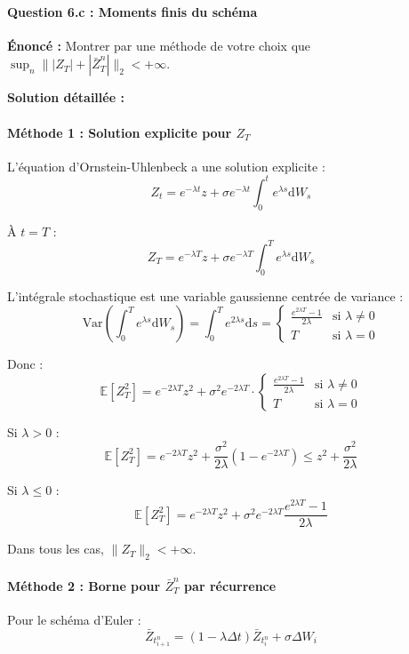 \documentclass[12pt,a4paper]{article}
\theoremstyle{definition}
\theoremstyle{remark}
\newcommand{\E}{\mathbb{E}}
\newcommand{\Var}{\text{Var}}
\newcommand{\dd}{\mathrm{d}}
\begin{document}
\paragraph{Question 6.c : Moments finis du schéma}

\textbf{Énoncé :} Montrer par une méthode de votre choix que $\sup_n \||Z_T| + |\bar{Z}_T^n|\|_2 < +\infty$.

\textbf{Solution détaillée :}

\paragraph{Méthode 1 : Solution explicite pour $Z_T$}

L'équation d'Ornstein-Uhlenbeck a une solution explicite :
\[
Z_t = e^{-\lambda t}z + \sigma e^{-\lambda t}\int_0^t e^{\lambda s}\dd W_s
\]

À $t = T$ :
\[
Z_T = e^{-\lambda T}z + \sigma e^{-\lambda T}\int_0^T e^{\lambda s}\dd W_s
\]

L'intégrale stochastique est une variable gaussienne centrée de variance :
\[
\Var\left(\int_0^T e^{\lambda s}\dd W_s\right) = \int_0^T e^{2\lambda s}\dd s = \begin{cases}
\frac{e^{2\lambda T} - 1}{2\lambda} & \text{si } \lambda \neq 0 \\
T & \text{si } \lambda = 0
\end{cases}
\]

Donc :
\[
\E[Z_T^2] = e^{-2\lambda T}z^2 + \sigma^2 e^{-2\lambda T} \cdot \begin{cases}
\frac{e^{2\lambda T} - 1}{2\lambda} & \text{si } \lambda \neq 0 \\
T & \text{si } \lambda = 0
\end{cases}
\]

Si $\lambda > 0$ :
\[
\E[Z_T^2] = e^{-2\lambda T}z^2 + \frac{\sigma^2}{2\lambda}(1 - e^{-2\lambda T}) \leq z^2 + \frac{\sigma^2}{2\lambda}
\]

Si $\lambda \leq 0$ :
\[
\E[Z_T^2] = e^{-2\lambda T}z^2 + \sigma^2 e^{-2\lambda T} \frac{e^{2\lambda T} - 1}{2\lambda}
\]

Dans tous les cas, $\|Z_T\|_2 < +\infty$.

\paragraph{Méthode 2 : Borne pour $\bar{Z}_T^n$ par récurrence}

Pour le schéma d'Euler :
\[
\bar{Z}_{t_{i+1}^n} = (1 - \lambda \Delta t)\bar{Z}_{t_i^n} + \sigma \Delta W_i
\]
\end{document}
